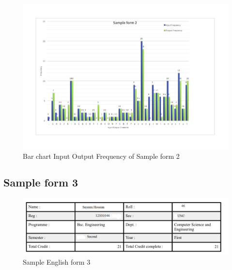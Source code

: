 \begin{figure}[H]
\centering
\includegraphics[width=1\textwidth]{form2.pdf}
\caption {Bar chart Input Output Frequency of Sample form 2}
\label {fig:bar2}
\end{figure}

\subsection{Sample form 3}

\begin{figure}[H]
\centering
\includegraphics[width=1\textwidth]{form3.png}
\caption {Sample English form 3}
\label {fig:form3}
\end{figure}

